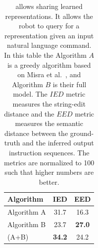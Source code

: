 \begin{table}
\caption{\robobrain{} allows sharing learned representations. It allows the robot to query \robobrain{} for a representation given an input natural language command. In this table the Algorithm $A$ is a greedy algorithm based on Misra et al.~\cite{misra2014tell}, and Algorithm $B$ is their full model. The $IED$ metric measures the string-edit distance and the $EED$ metric measures the semantic distance between the ground-truth and the inferred output instruction sequences. The metrics are normalized to 100 such that higher numbers are better.}
\label{tbl:grounding-results}
\centering
\begin{tabular}{l|cc}
\hline
\textbf{Algorithm} & \textbf{IED} & \textbf{EED}\\
\hline
Algorithm A & 31.7 & 16.3\\
Algorithm B & 23.7 & \textbf{27.0}\\
\robobrain{} (A+B) & \textbf{34.2} & 24.2\\
\hline
\end{tabular}
\end{table}
